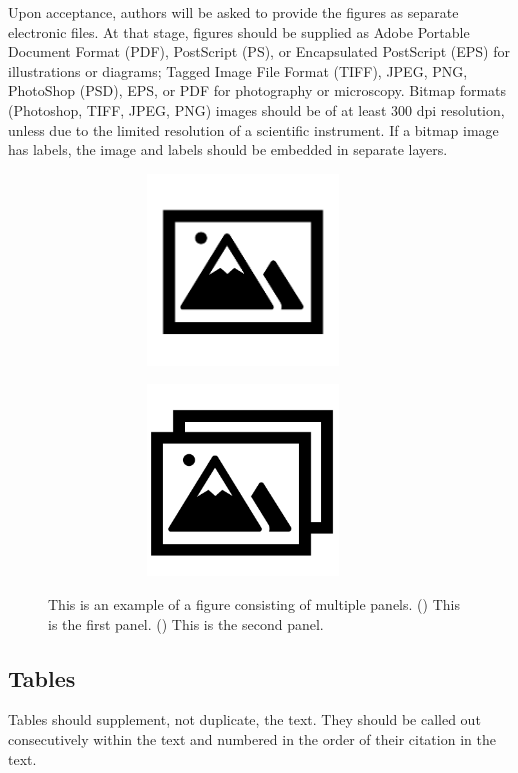 \documentclass{article}
\begin{document}
Upon acceptance, authors will be asked to provide the figures as separate electronic files. At that stage, figures should be supplied as Adobe Portable Document Format (PDF), PostScript (PS), or Encapsulated PostScript (EPS) for illustrations or diagrams; Tagged Image File Format (TIFF), JPEG, PNG, PhotoShop (PSD), EPS, or PDF for photography or microscopy. Bitmap formats (Photoshop, TIFF, JPEG, PNG) images should be of at least 300 dpi resolution, unless due to the limited resolution of a scientific instrument. If a bitmap image has labels, the image and labels should be embedded in separate layers.
\begin{figure}[h]
    \centering
    \begin{subfigure}{0.4\textwidth}
        \includegraphics[width=0.9\textwidth, height=2in]{fig 1}
        \caption{\label{fig:2A}}
    \end{subfigure}
    \begin{subfigure}{0.4\textwidth}
        \includegraphics[width=0.9\textwidth, height=2in]{fig 2}
        \caption{\label{fig:2B}}
    \end{subfigure}
    \caption{This is an example of a figure consisting of multiple panels.     () This is the first panel. () This is the second panel.}
    \label{fig:2}
\end{figure}

\subsection*{Tables}
Tables should supplement, not duplicate, the text. They should be called out consecutively within the text and numbered in the order of their citation in the text. 
\end{document}
